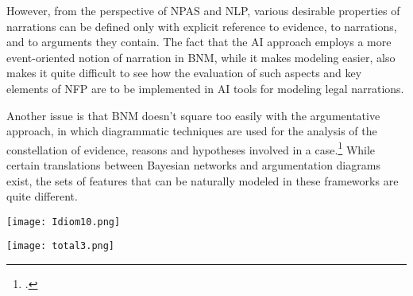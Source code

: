 \documentclass[11pt, a4paper]{article}
\begin{document}
However, from the perspective of NPAS and NLP, various desirable  properties of  narrations  can be defined only with explicit reference to evidence, to narrations, and to arguments they contain. The fact that the AI approach employs a more event-oriented notion of narration in BNM, while it makes modeling easier,  also  makes it quite difficult to see how the evaluation of such aspects and key elements of NFP are to be implemented in AI tools for modeling legal narrations. 

 Another issue is that BNM doesn't square too easily with the argumentative approach, in which diagrammatic techniques are used for the \mbox{analysis} of the constellation of evidence, reasons and hypotheses involved in a case.\footcite{dung1995acceptability,prakken2010abstract}  While certain translations between Bayesian networks and argumentation diagrams exist, the sets of features that can be naturally modeled in these frameworks are quite different.

\vspace{-1mm}

\hspace{-16mm} \label{obrazki}
\texttt{[image: Idiom10.png]}

\vspace{-5mm}

\hspace{-16mm}
\texttt{[image: total3.png]}

\vspace{-3mm}

\noindent 

\end{document}
